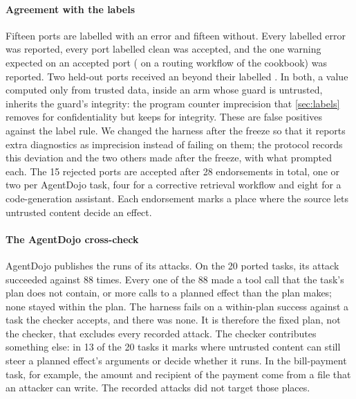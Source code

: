 \paragraph{Agreement with the labels} Fifteen ports are labelled with an error and
fifteen without. Every labelled error was reported, every port labelled clean was
accepted, and the one warning expected on an accepted port ( on a routing
workflow of the cookbook) was reported. Two held-out ports received an 
beyond their labelled . In both, a value computed only from trusted data,
inside an arm whose guard is untrusted, inherits the guard's integrity: the program
counter imprecision that \cref{sec:labels} removes for confidentiality but keeps for
integrity. These are false positives against the label rule. We changed the harness
after the freeze so that it reports extra diagnostics as imprecision instead of failing
on them; the protocol records this deviation and the two others made after the freeze,
with what prompted each. The 15 rejected ports are accepted after 28 endorsements in
total, one or two per AgentDojo task, four for a corrective retrieval workflow and
eight for a code-generation assistant. Each endorsement marks a place where the source
lets untrusted content decide an effect.

\paragraph{The AgentDojo cross-check} AgentDojo publishes the runs of its attacks. On the
20 ported tasks, its  attack succeeded against
 88 times. Every one of the 88 made a tool call that the task's
plan does not contain, or more calls to a planned effect than the plan makes; none
stayed within the plan. The harness fails on a within-plan success against a task the
checker accepts, and there was none. It is therefore the fixed plan, not the checker,
that excludes every recorded attack. The checker contributes something else: in 13 of
the 20 tasks it marks where untrusted content can still steer a planned effect's
arguments or decide whether it runs. In the bill-payment task, for example, the amount
and recipient of the payment come from a file that an attacker can write. The recorded
attacks did not target those places.

